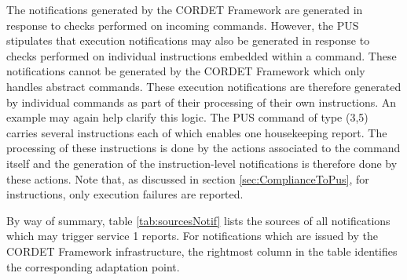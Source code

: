 \documentclass{pnp_article}
\begin{document}
The notifications generated by the CORDET Framework are generated in response to checks performed on incoming commands. However, the PUS stipulates that execution notifications may also be generated in response to checks performed on individual instructions embedded within a command. These notifications cannot be generated by the CORDET Framework which only handles abstract commands. These execution notifications are therefore generated by individual commands as part of their processing of their own instructions. An example may again help clarify this logic. The PUS command of type (3,5) carries several instructions each of which enables one housekeeping report. The processing of these instructions is done by the actions associated to the command itself and the generation of the instruction-level notifications is therefore done by these actions. Note that, as discussed in section \ref{sec:ComplianceToPus}, for instructions, only execution failures are reported.

By way of summary, table \ref{tab:sourcesNotif} lists the sources of all notifications which may trigger service 1 reports. For notifications which are issued by the CORDET Framework infrastructure, the rightmost column in the table identifies the corresponding adaptation point.
\end{document}

